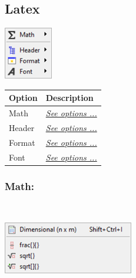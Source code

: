 \hypertarget{menu_insert_latex}{}
\subsection{Latex}

\includegraphics[scale=0.8]{./res/menu_insert_latex.png}\\

\begin{scriptsize}
  \begin{tabularx}{\textwidth}{>{\hsize=0.3\hsize}X>{\hsize=0.7\hsize}X}\\
    \hline
    \textbf{Option} & \textbf{Description} \\
    \hline
    Math & \textit{\href{\#menu\_insert\_latex\_math}{See options ...}} \\
    \hdashline[1pt/1pt]
    Header & \textit{\href{\#menu\_insert\_latex\_header}{See options ...}} \\
    Format & \textit{\href{\#menu\_insert\_latex\_format}{See options ...}} \\
    Font & \textit{\href{\#menu\_insert\_latex\_font}{See options ...}} \\
    \hline
  \end{tabularx}
\end{scriptsize}


\hypertarget{menu_insert_latex_math}{}
\subsubsection{Math:}\\

\includegraphics[scale=0.8]{./res/menu_insert_latex_math.png}\\

